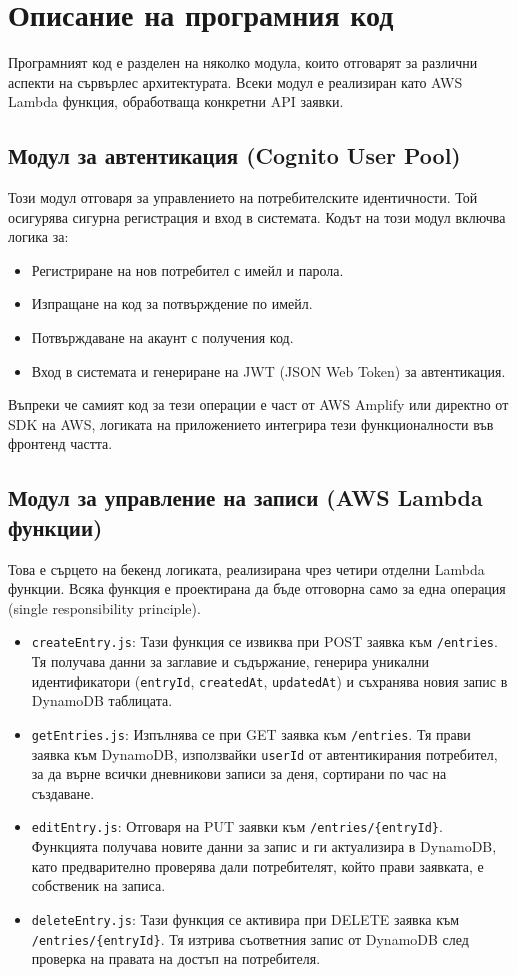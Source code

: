 \documentclass[12pt]{article}
\begin{document}
\medskip


\section{Описание на програмния код}

\noindent Програмният код е разделен на няколко модула, които отговарят за различни аспекти на сървърлес архитектурата. Всеки модул е реализиран като AWS Lambda функция, обработваща конкретни API заявки.

\subsection{Модул за автентикация (Cognito User Pool)}
Този модул отговаря за управлението на потребителските идентичности. Той осигурява сигурна регистрация и вход в системата. Кодът на този модул включва логика за:
\begin{itemize}
    \item Регистриране на нов потребител с имейл и парола.
    \item Изпращане на код за потвърждение по имейл.
    \item Потвърждаване на акаунт с получения код.
    \item Вход в системата и генериране на JWT (JSON Web Token) за автентикация.
\end{itemize}
Въпреки че самият код за тези операции е част от AWS Amplify или директно от SDK на AWS, логиката на приложението интегрира тези функционалности във фронтенд частта.

\subsection{Модул за управление на записи (AWS Lambda функции)}
Това е сърцето на бекенд логиката, реализирана чрез четири отделни Lambda функции. Всяка функция е проектирана да бъде отговорна само за една операция (single responsibility principle).

\begin{itemize}
    \item \texttt{createEntry.js}: Тази функция се извиква при POST заявка към \texttt{/entries}. Тя получава данни за заглавие и съдържание, генерира уникални идентификатори (\texttt{entryId}, \texttt{createdAt}, \texttt{updatedAt}) и съхранява новия запис в DynamoDB таблицата.
    \item \texttt{getEntries.js}: Изпълнява се при GET заявка към \texttt{/entries}. Тя прави заявка към DynamoDB, използвайки \texttt{userId} от автентикирания потребител, за да върне всички дневникови записи за деня, сортирани по час на създаване.
    \item \texttt{editEntry.js}: Отговаря на PUT заявки към \texttt{/entries/\{entryId\}}. Функцията получава новите данни за запис и ги актуализира в DynamoDB, като предварително проверява дали потребителят, който прави заявката, е собственик на записа.
    \item \texttt{deleteEntry.js}: Тази функция се активира при DELETE заявка към \texttt{/entries/\{entryId\}}. Тя изтрива съответния запис от DynamoDB след проверка на правата на достъп на потребителя.
\end{itemize}
\end{document}
